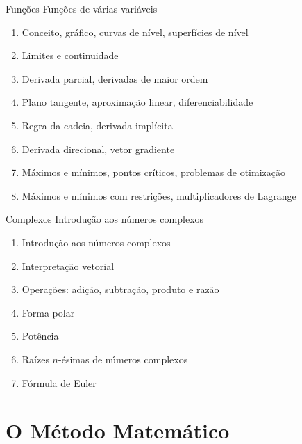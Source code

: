 \begin{frame}{Funções}
  Funções de várias variáveis
  \begin{enumerate}[<+->]
    \item Conceito, gráfico, curvas de nível, superfícies de nível
    \item Limites e continuidade
    \item Derivada parcial, derivadas de maior ordem
    \item Plano tangente, aproximação linear, diferenciabilidade
    \item Regra da cadeia, derivada implícita
    \item Derivada direcional, vetor gradiente
    \item Máximos e mínimos, pontos críticos, problemas de otimização
    \item Máximos e mínimos com restrições, multiplicadores de Lagrange
  \end{enumerate}
\end{frame}

\begin{frame}{Complexos}
  Introdução aos números complexos
  \begin{enumerate}[<+->]
    \item Introdução aos números complexos
    \item Interpretação vetorial
    \item Operações: adição, subtração, produto e razão
    \item Forma polar
    \item Potência
    \item Raízes $n$-ésimas de números complexos
    \item Fórmula de Euler
  \end{enumerate}
\end{frame}

\section{O Método Matemático}

